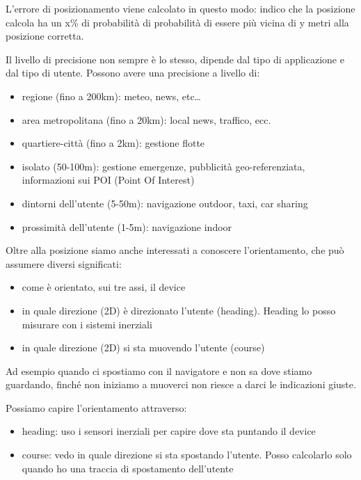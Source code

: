 L'errore di posizionamento viene calcolato in questo modo: indico che la posizione calcola ha un x\% di probabilità di probabilità di essere più vicina di y metri alla posizione corretta. 

Il livello di precisione non sempre è lo stesso, dipende dal tipo di applicazione e dal tipo di utente. 
Possono avere una precisione a livello di: 
\begin{itemize}
    \item regione (fino a 200km): meteo, news, etc… 
    \item area metropolitana (fino a 20km): local news, traffico, ecc.
    \item quartiere-città (fino a 2km): gestione flotte 
    \item isolato (50-100m): gestione emergenze, pubblicità geo-referenziata, informazioni sui POI (Point Of Interest) 
    \item dintorni dell’utente (5-50m): navigazione outdoor, taxi, car sharing 
    \item prossimità dell’utente (1-5m): navigazione indoor
\end{itemize}

Oltre alla posizione siamo anche interessati a conoscere 
l'orientamento, che può assumere diversi significati:
\begin{itemize}
    \item come è orientato, sui tre assi, il device 
    \item in quale direzione (2D) è direzionato l’utente (heading). Heading lo posso misurare con i sistemi inerziali
    \item in quale direzione (2D) si sta muovendo l’utente (course)
\end{itemize}
Ad esempio quando ci spostiamo con il navigatore e non sa dove stiamo guardando, finché non iniziamo a muoverci non riesce a darci le indicazioni giuste. 

Possiamo capire l'orientamento attraverso:
\begin{itemize}
    \item heading: uso i sensori inerziali per capire dove sta puntando il device
    \item course: vedo in quale direzione si sta spostando l'utente. Posso calcolarlo solo quando ho una traccia di spostamento dell'utente 
\end{itemize}

